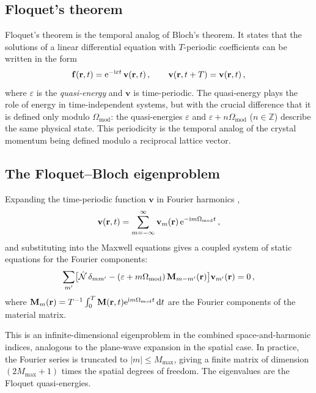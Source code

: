 \subsection{Floquet's theorem}
\label{sec:ch13-floquet-theorem}

Floquet's theorem is the temporal analog of Bloch's theorem.  It states
that the solutions of a linear differential equation with
$T$-periodic coefficients can be written in the form
\begin{equation}\label{eq:ch13-floquet-form}
  \mathbf{f}(\mathbf{r},t) = \mathrm{e}^{-\mathrm{i}\varepsilon t}\,
  \mathbf{v}(\mathbf{r},t)\,,
  \qquad \mathbf{v}(\mathbf{r},t+T) = \mathbf{v}(\mathbf{r},t)\,,
\end{equation}
where $\varepsilon$ is the \emph{quasi-energy} and $\mathbf{v}$ is
time-periodic.  The quasi-energy plays the role of energy in
time-independent systems, but with the crucial difference that it is
defined only modulo $\Omega_{\mathrm{mod}}$: the quasi-energies
$\varepsilon$ and $\varepsilon+n\Omega_{\mathrm{mod}}$ ($n\in\mathbb{Z}$)
describe the same physical state.  This periodicity is the temporal
analog of the crystal momentum being defined modulo a reciprocal
lattice vector.

\subsection{The Floquet--Bloch eigenproblem}
\label{sec:ch13-floquet-bloch}

Expanding the time-periodic function $\mathbf{v}$ in Fourier harmonics
\cite{ozawa2018topological},
\begin{equation}\label{eq:ch13-fourier-expansion}
  \mathbf{v}(\mathbf{r},t) = \sum_{m=-\infty}^{\infty}
  \mathbf{v}_m(\mathbf{r})\,\mathrm{e}^{-\mathrm{i} m\Omega_{\mathrm{mod}}t}\,,
\end{equation}
and substituting into the Maxwell equations gives a coupled system of
static equations for the Fourier components:
\begin{equation}\label{eq:ch13-floquet-static}
  \sum_{m'}\bigl[
    \hat{\mathcal{N}}\,\delta_{mm'} - (\varepsilon+m\Omega_{\mathrm{mod}})\,
    \mathbf{M}_{m-m'}(\mathbf{r})
  \bigr]\mathbf{v}_{m'}(\mathbf{r}) = 0\,,
\end{equation}
where $\mathbf{M}_m(\mathbf{r})=T^{-1}\int_0^T\mathbf{M}(\mathbf{r},t)
\mathrm{e}^{\mathrm{i} m\Omega_{\mathrm{mod}}t}\,\mathrm{d} t$ are the Fourier components of
the material matrix.

This is an infinite-dimensional eigenproblem in the combined
space-and-harmonic indices, analogous to the plane-wave expansion in
the spatial case.  In practice, the Fourier series is truncated to
$|m|\leq M_{\max}$, giving a finite matrix of dimension
$(2M_{\max}+1)$ times the spatial degrees of freedom.  The eigenvalues
are the Floquet quasi-energies.

